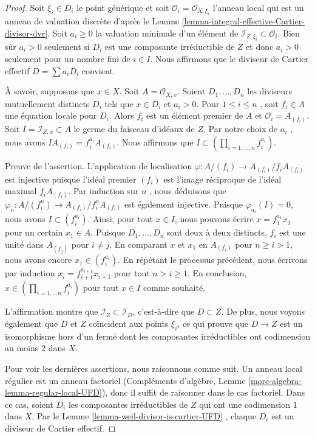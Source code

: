 \begin{proof}
Soit  $\xi_i \in D_i$  le point générique et soit  $\mathcal{O}_i = \mathcal{O}_{X, \xi_i}$  l'anneau local qui est
un anneau de valuation discrète d'après le Lemme  \ref{lemma-integral-effective-Cartier-divisor-dvr}. Soit  $a_i \geq 0$ 
la valuation minimale d'un élément de  $\mathcal{I}_{Z, \xi_i} \subset \mathcal{O}_i$. Bien sûr  $a_i > 0$ 
seulement si  $D_i$  est une composante irréductible de  $Z$  et donc
 $a_i > 0$  seulement pour un nombre fini de  $i \in I$. Nous affirmons que le
diviseur de Cartier effectif  $D = \sum a_i D_i$  convient.

\medskip\noindent
À savoir, supposons que  $x \in X$. Soit  $A = \mathcal{O}_{X, x}$. Soient  $D_1, \ldots, D_n$  les
diviseurs mutuellement distincts  $D_i$  tels que  $x \in D_i$  et
 $a_i > 0$. Pour  $1 \leq i \leq n$ , soit  $f_i \in A$  une équation locale pour
 $D_i$. Alors  $f_i$  est un élément premier de  $A$  et
 $\mathcal{O}_i = A_{(f_i)}$. Soit  $I = \mathcal{I}_{Z, x} \subset A$  le germe du faisceau d'idéaux de  $Z$. Par
notre choix de  $a_i$ , nous avons  $I A_{(f_i)} = f_i^{a_i}A_{(f_i)}$. Nous affirmons que
 $I \subset (\prod_{i = 1, \ldots, n} f_i^{a_i})$.

\medskip\noindent
Preuve de l'assertion. L'application de localisation  $\varphi : A/(f_i) \to A_{(f_i)}/f_iA_{(f_i)}$  est injective puisque
l'idéal premier  $(f_i)$  est l'image réciproque de l'idéal maximal
 $f_iA_{(f_i)}$. Par induction sur  $n$ , nous déduisons que  $\varphi_n : A/(f_i^n)\to A_{(f_i)}/f_i^nA_{(f_i)}$  est
également injective. Puisque  $\varphi_{a_i}(I) = 0$, nous avons  $I \subset (f_i^{a_i})$. Ainsi, pour
tout  $x \in I$, nous pouvons écrire  $x = f_1^{a_1}x_1$  pour un certain  $x_1 \in A$.
Puisque  $D_1, \ldots, D_n$  sont deux à deux distincts,  $f_i$  est une unité dans
 $A_{(f_j)}$  pour  $i \not = j$. En comparant  $x$  et  $x_1$  en
 $A_{(f_i)}$  pour  $n \geq i > 1$, nous avons encore  $x_1 \in (f_i^{a_i})$. En répétant le
processus précédent, nous écrivons par induction  $x_i = f_{i + 1}^{a_{i + 1}}x_{i + 1}$  pour tout
 $n > i \geq 1$. En conclusion,  $x \in (\prod_{i = 1, \ldots n} f_i^{a_i})$  pour tout  $x \in I$  comme souhaité.

\medskip\noindent
L'affirmation montre que  $\mathcal{I}_Z \subset \mathcal{I}_D$, c'est-à-dire que  $D \subset Z$. De plus,
nous voyons également que  $D$  et  $Z$  coïncident aux points  $\xi_i$,
ce qui prouve que  $D \to Z$  est un isomorphisme hors d'un fermé dont les
composantes irréductibles ont codimension au moins  $2$  dans  $X$.

\medskip\noindent
Pour voir les dernières assertions, nous raisonnons comme suit. Un anneau local
régulier est un anneau factoriel (Compléments d'algèbre, Lemme  \ref{more-algebra-lemma-regular-local-UFD}), donc il suffit de
raisonner dans le cas factoriel. Dans ce cas, soient  $D_i$  les composantes
irréductibles de  $Z$  qui ont une codimension  $1$  dans
 $X$. Par le Lemme  \ref{lemma-weil-divisor-is-cartier-UFD} , chaque  $D_i$  est un diviseur de
Cartier effectif.
\end{proof}

